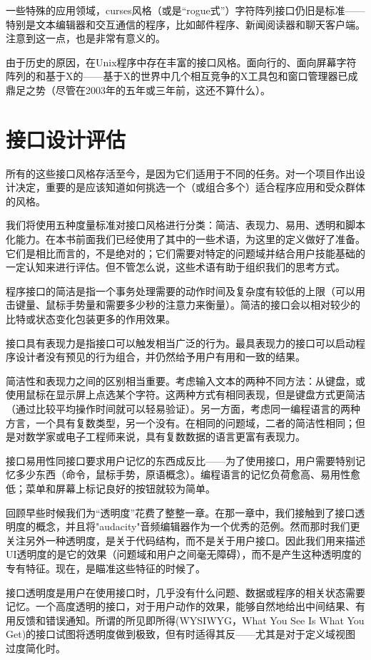 \documentclass[12pt,oneside]{book}
\begin{document}
\begin{common-format}
一些特殊的应用领域，curses风格（或是“rogue式”）字符阵列接口仍旧是标准——特别是文本编辑器和交互通信的程序，比如邮件程序、新闻阅读器和聊天客户端。注意到这一点，也是非常有意义的。

由于历史的原因，在Unix程序中存在丰富的接口风格。面向行的、面向屏幕字符阵列的和基于X的——基于X的世界中几个相互竞争的X工具包和窗口管理器已成鼎足之势（尽管在2003年的五年或三年前，这还不算什么）。

\section{接口设计评估}
所有的这些接口风格存活至今，是因为它们适用于不同的任务。对一个项目作出设计决定，重要的是应该知道如何挑选一个（或组合多个）适合程序应用和受众群体的风格。

我们将使用五种度量标准对接口风格进行分类：简洁、表现力、易用、透明和脚本化能力。在本书前面我们已经使用了其中的一些术语，为这里的定义做好了准备。它们是相比而言的，不是绝对的；它们需要对特定的问题域并结合用户技能基础的一定认知来进行评估。但不管怎么说，这些术语有助于组织我们的思考方式。

程序接口的简洁是指一个事务处理需要的动作时间及复杂度有较低的上限（可以用击键量、鼠标手势量和需要多少秒的注意力来衡量）。简洁的接口会以相对较少的比特或状态变化包装更多的作用效果。

接口具有表现力是指接口可以触发相当广泛的行为。最具表现力的接口可以启动程序设计者没有预见的行为组合，并仍然给予用户有用和一致的结果。

简洁性和表现力之间的区别相当重要。考虑输入文本的两种不同方法：从键盘，或使用鼠标在显示屏上点选某个字符。这两种方式有相同表现，但是键盘方式更简洁（通过比较平均操作时间就可以轻易验证）。另一方面，考虑同一编程语言的两种方言，一个具有复数类型，另一个没有。在相同的问题域，二者的简洁性相同；但是对数学家或电子工程师来说，具有复数数据的语言更富有表现力。

接口易用性同接口要求用户记忆的东西成反比——为了使用接口，用户需要特别记忆多少东西（命令，鼠标手势，原语概念）。编程语言的记忆负荷愈高、易用性愈低；菜单和屏幕上标记良好的按钮就较为简单。

回顾早些时候我们为“透明度”花费了整整一章。在那一章中，我们接触到了接口透明度的概念，并且将"audacity"音频编辑器作为一个优秀的范例。然而那时我们更关注另外一种透明度，是关于代码结构，而不是关于用户接口。因此我们用来描述UI透明度的是它的效果（问题域和用户之间毫无障碍），而不是产生这种透明度的专有特征。现在，是瞄准这些特征的时候了。

接口透明度是用户在使用接口时，几乎没有什么问题、数据或程序的相关状态需要记忆。一个高度透明的接口，对于用户动作的效果，能够自然地给出中间结果、有用反馈和错误通知。所谓的所见即所得(WYSIWYG，What You See Is What You Get)的接口试图将透明度做到极致，但有时适得其反——尤其是对于定义域视图过度简化时。


\end{common-format}
\end{document}
